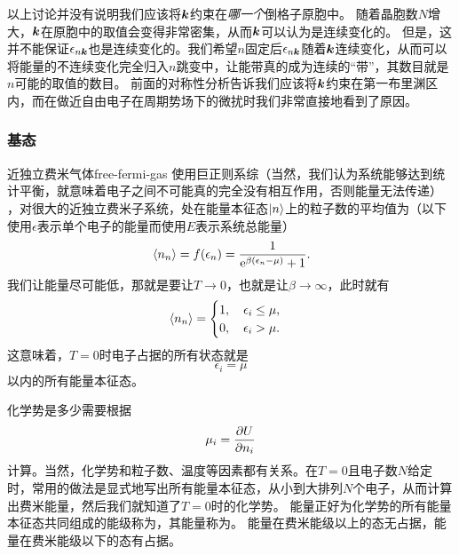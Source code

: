 以上讨论并没有说明我们应该将$\vb*{k}$约束在\emph{哪一个}倒格子原胞中。
随着晶胞数$N$增大，$\vb*{k}$在原胞中的取值会变得非常密集，从而$\vb*{k}$可以认为是连续变化的。
但是，这并不能保证$\epsilon_{n \vb*{k}}$也是连续变化的。我们希望$n$固定后$\epsilon_{n \vb*{k}}$随着$\vb*{k}$连续变化，从而可以将能量的不连续变化完全归入$n$跳变中，让能带真的成为连续的“带”，其数目就是$n$可能的取值的数目。
前面的对称性分析告诉我们应该将$\vb*{k}$约束在第一布里渊区内，而在做近自由电子在周期势场下的微扰时我们非常直接地看到了原因。

\subsubsection{基态} 

\begin{back}{近独立费米气体}{free-fermi-gas}
    使用巨正则系综（当然，我们认为系统能够达到统计平衡，就意味着电子之间不可能真的完全没有相互作用，否则能量无法传递）
    ，对很大的近独立费米子系统，处在能量本征态$\ket{n}$上的粒子数的平均值为（以下使用$\epsilon$表示单个电子的能量而使用$E$表示系统总能量）
    \begin{equation}
        \expval*{{n}_n} = f(\epsilon_n) = \frac{1}{\mathrm{e}^{\beta (\epsilon_n-\mu)} + 1}.
        \label{eq:fermi-dirac-distribution}
    \end{equation}
    我们让能量尽可能低，那就是要让$T\to 0$，也就是让$\beta\to \infty$，此时就有
    \begin{equation}
        \expval*{{n}_n} = \begin{cases}
            1, \quad \epsilon_i \leq \mu, \\
            0, \quad \epsilon_i > \mu.
        \end{cases}
    \end{equation}
    这意味着，$T=0$时电子占据的所有状态就是
    \begin{equation}
        \epsilon_i = \mu
    \end{equation}
    以内的所有能量本征态。

    化学势是多少需要根据
    \begin{equation}
        \mu_i = \pdv{U}{n_i}
    \end{equation}
    计算。当然，化学势和粒子数、温度等因素都有关系。在$T=0$且电子数$N$给定时，常用的做法是显式地写出所有能量本征态，从小到大排列$N$个电子，从而计算出费米能量，然后我们就知道了$T=0$时的化学势。
    能量正好为化学势的所有能量本征态共同组成的能级称为，其能量称为。
    能量在费米能级以上的态无占据，能量在费米能级以下的态有占据。


\end{back}
